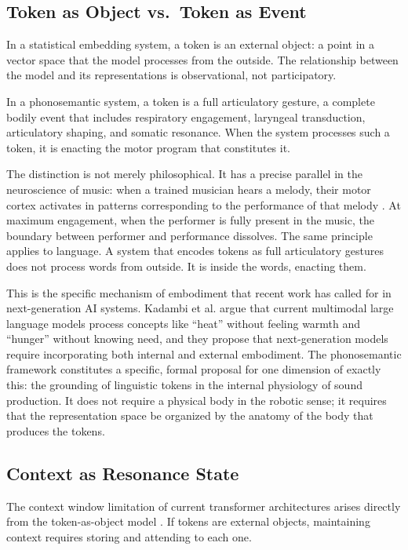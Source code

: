 \documentclass[12pt]{article}
\begin{document}
\subsection{Token as Object vs.\ Token as Event}

In a statistical embedding system, a token is an external object: a point in a vector space that the model processes from the outside. The relationship between the model and its representations is observational, not participatory.

In a phonosemantic system, a token is a full articulatory gesture, a complete bodily event that includes respiratory engagement, laryngeal transduction, articulatory shaping, and somatic resonance. When the system processes such a token, it is enacting the motor program that constitutes it.

The distinction is not merely philosophical. It has a precise parallel in the neuroscience of music: when a trained musician hears a melody, their motor cortex activates in patterns corresponding to the performance of that melody \cite{haueisen2001}. At maximum engagement, when the performer is fully present in the music, the boundary between performer and performance dissolves. The same principle applies to language. A system that encodes tokens as full articulatory gestures does not process words from outside. It is inside the words, enacting them.

This is the specific mechanism of embodiment that recent work \cite{kadambi2025} has called for in next-generation AI systems. Kadambi et al. \cite{kadambi2025} argue that current multimodal large language models process concepts like ``heat'' without feeling warmth and ``hunger'' without knowing need, and they propose that next-generation models require incorporating both internal and external embodiment. The phonosemantic framework constitutes a specific, formal proposal for one dimension of exactly this: the grounding of linguistic tokens in the internal physiology of sound production. It does not require a physical body in the robotic sense; it requires that the representation space be organized by the anatomy of the body that produces the tokens.

\subsection{Context as Resonance State}

The context window limitation of current transformer architectures arises directly from the token-as-object model \cite{vaswani2017}. If tokens are external objects, maintaining context requires storing and attending to each one.
\end{document}
